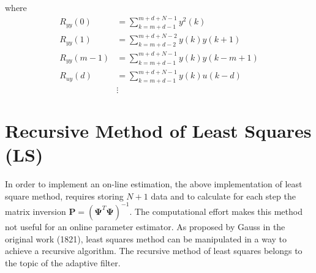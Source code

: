 \documentclass[11pt,a4paper,oneside]{book}
\numberwithin{equation}{section}
\theoremstyle{it}
\theoremstyle{definition}
\begin{document}
where
\begin{equation*}
	\begin{aligned}
		R_{yy}(0)&= \sum_{k=m+d-1}^{m+d+N-1}y^2(k) \\[6pt]
		R_{yy}(1)&= \sum_{k=m+d-2}^{m+d+N-2}y(k)y(k+1) \\[6pt]
		R_{yy}(m-1)&= \sum_{k=m+d-1}^{m+d+N-1}y(k)y(k-m+1) \\[6pt]
		R_{uy}(d)&= \sum_{k=m+d-1}^{m+d+N-1}y(k)u(k-d) \\[6pt]
		& \vdots
	\end{aligned}
\end{equation*}
\section{Recursive Method of Least Squares (LS)}
In order to implement an on-line estimation, the above implementation of least 
square method, requires storing $N+1$ data and to calculate for each step the 
matrix inversion $\mathbf{P} = \left(\mathbf{\Psi}^T\mathbf{\Psi}\right)^{-1}$. 
The computational effort makes this method not useful for an online parameter 
estimator.
As proposed by Gauss in the original work (1821), least squares method can be 
manipulated in a way to achieve a recursive algorithm. The recursive method of 
least squares belongs to the topic of the adaptive filter.
\end{document}
